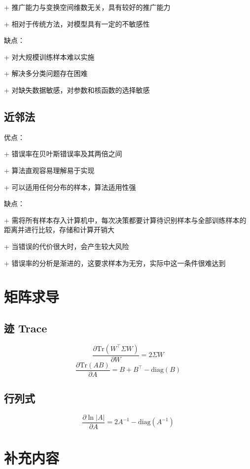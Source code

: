 \documentclass[openany]{ctexbook}
\theoremstyle{kaiti}
\theoremstyle{normal}
\begin{document}
+ 推广能力与变换空间维数无关，具有较好的推广能力

+ 相对于传统方法，对模型具有一定的不敏感性

缺点：

+ 对大规模训练样本难以实施

+ 解决多分类问题存在困难

+ 对缺失数据敏感，对参数和核函数的选择敏感

\section{近邻法}

优点：

+ 错误率在贝叶斯错误率及其两倍之间

+ 算法直观容易理解易于实现

+ 可以适用任何分布的样本，算法适用性强

缺点：

+ 需将所有样本存入计算机中，每次决策都要计算待识别样本与全部训练样本的距离并进行比较，存储和计算开销大

+ 当错误的代价很大时，会产生较大风险

+ 错误率的分析是渐进的，这要求样本为无穷，实际中这一条件很难达到

\chapter{矩阵求导}

\section{迹 Trace}
\begin{equation}
\frac{\partial \mathrm{Tr}\left(W^{\top}\Sigma W \right)}{\partial W}=2\Sigma W
\end{equation}
\begin{equation}
\frac{\partial \mathrm{Tr}\left(AB \right)}{\partial A}=B+B^{\top}-\mathrm{diag}\left(B \right)
\end{equation}

\section{行列式}
\begin{equation}
\frac{\partial \ln |A|}{\partial A}=2A^{-1}-\mathrm{diag}\left(A^{-1} \right)
\end{equation}

\chapter{补充内容}
\end{document}
